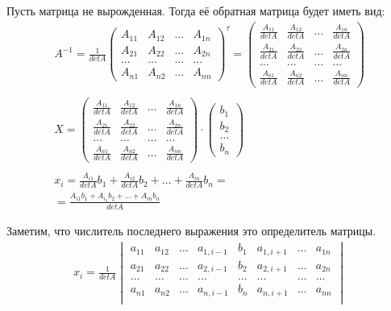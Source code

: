 Пусть матрица не вырожденная. Тогда её обратная матрица будет иметь вид: 
\begin{gather*}
  A^{-1} = \frac{1}{det A} \left( 
    \begin{matrix}
    A_{11} & A_{12} & \ldots & A_{1n} \\
    A_{21} & A_{22} & \ldots & A_{2n} \\
    \ldots & \ldots & \ldots & \ldots \\
    A_{n1} & A_{n2} & \ldots & A_{nn}
    \end{matrix}
  \right)^{\tau} = \left( 
  \begin{matrix}
    \frac{A_{11}}{det A} & \frac{A_{12}}{det A} & \ldots & \frac{A_{1n}}{det A} \\
    \frac{A_{21}}{det A} & \frac{A_{22}}{det A} & \ldots & \frac{A_{2n}}{det A} \\
    \ldots & \ldots & \ldots & \ldots \\
    \frac{A_{n1}}{det A} & \frac{A_{n2}}{det A} & \ldots & \frac{A_{nn}}{det A}
  \end{matrix}
  \right) \\
  \\
  X = \left( 
  \begin{matrix}
    \frac{A_{11}}{det A} & \frac{A_{12}}{det A} & \ldots & \frac{A_{1n}}{det A} \\
    \frac{A_{21}}{det A} & \frac{A_{22}}{det A} & \ldots & \frac{A_{2n}}{det A} \\
    \ldots & \ldots & \ldots & \ldots \\
    \frac{A_{n1}}{det A} & \frac{A_{n2}}{det A} & \ldots & \frac{A_{nn}}{det A}
  \end{matrix}\right) \cdot \left( 
  \begin{matrix}
    b_1 \\
    b_2 \\
    \ldots \\
    b_{n}
  \end{matrix}
\right) \\
  \\
  x_i = 
  \frac{A_{i1}}{det A} b_1 +
  \frac{A_{i2}}{det A} b_2 +
  \ldots +
  \frac{A_{in}}{det A} b_n = \\
  = \frac{A_{i1}b_1 + A_{i_2}b_2 + \ldots + A_{in}b_n}{det A}
\end{gather*}

Заметим, что числитель последнего выражения это определитель матрицы.
\begin{gather*}
  x_i = \frac{1}{det A}
  \begin{vmatrix} 
    a_{11} & a_{12} & \ldots & a_{1,i-1} & b_1 & a_{1,i+1} & \ldots & a_{1n} \\
    a_{21} & a_{22} & \ldots & a_{2,i-1} & b_2 & a_{2,i+1} & \ldots & a_{2n} \\
    \ldots & \ldots & \ldots & \ldots & \ldots & \ldots & \ldots & \ldots \\
    a_{n1} & a_{n2} & \ldots & a_{n,i-1} & b_n & a_{n,i+1} & \ldots & a_{nn} \\
  \end{vmatrix} 
\end{gather*}

